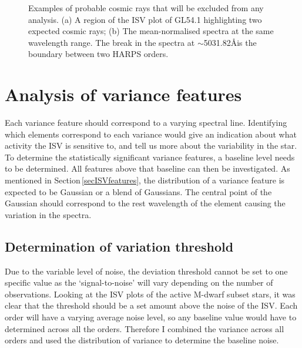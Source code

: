 \begin{figure}
	\hspace{-2cm}
	\captionsetup{width=.8\textwidth}
    \caption{Examples of probable cosmic rays that will be excluded from any analysis. (a) A region of the ISV plot of GL54.1 highlighting two expected cosmic rays; (b) The mean-normalised spectra at the same wavelength range. The break in the spectra at $\sim$5031.82\AA\:is the boundary between two HARPS orders.}
    \label{figCosmic_example}
\end{figure}

\section{Analysis of variance features}
Each variance feature should correspond to a varying spectral line. Identifying which elements correspond to each variance would give an indication about what activity the ISV is sensitive to, and tell us more about the variability in the star. To determine the statistically significant variance features, a baseline level needs to be determined. All features above that baseline can then be investigated. As mentioned in Section\,\ref{secISVfeatures}, the distribution of a variance feature is expected to be Gaussian or a blend of Gaussians. The central point of the Gaussian should correspond to the rest wavelength of the element causing the variation in the spectra.

\subsection{Determination of variation threshold}
Due to the variable level of noise, the deviation threshold cannot be set to one specific value as the `signal-to-noise' will vary depending on the number of observations. Looking at the ISV plots of the active M-dwarf subset stars, it was clear that the threshold should be a set amount above the noise of the ISV. Each order will have a varying average noise level, so any baseline value would have to determined across all the orders. Therefore I combined the variance across all orders and used the distribution of variance to determine the baseline noise.\\


